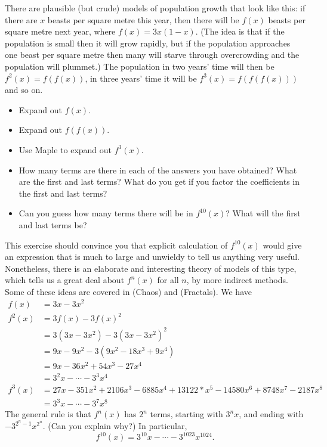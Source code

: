 \documentclass[a4paper]{book}
\theoremstyle{definition}
\newenvironment{starex}{
 \renewcommand{\thetheorem}{\arabic{chapter}.\arabic{section}.\arabic{theorem}${}^*$}
 \exercise
}{\endexercise}
\renewenvironment{solution}{\SolutionInline}{\endSolutionInline}
\begin{document}
\begin{starex}
 There are plausible (but crude) models of population growth
  that look like this: if there are $x$ beasts
 per square metre this year, then there will be $f(x)$ beasts per square
 metre next year, where $f(x)=3x(1-x)$.  (The idea is that if the
 population is small then it will grow rapidly, but if the population
 approaches one beast per square metre then many will starve
 through overcrowding and the population will plummet.)  The population
 in two years' time will then be $f^2(x)=f(f(x))$, in three years' time
 it will be $f^3(x)=f(f(f(x)))$ and so on.
 \begin{itemize}
  \item Expand out $f(x)$.
  \item Expand out $f(f(x))$.
  \item Use Maple to expand out $f^3(x)$.
  \item How many terms are there in each of the answers you have
   obtained?  What are the first and last terms?  What do you get if
   you factor the coefficients in the first and last terms?
  \item Can you guess how many terms there will be in $f^{10}(x)$?
   What will the first and last terms be?
 \end{itemize}
 This exercise should convince you that explicit calculation of
 $f^{10}(x)$ would give an expression that is much to large and
 unwieldy to tell us anything very useful.  Nonetheless, there is an
 elaborate and interesting theory of models of this type, which tells
 us a great deal about $f^n(x)$ for all $n$, by more indirect
 methods.  Some of these ideas are covered in  (Chaos) and
  (Fractals).
\end{starex}
\begin{solution}
 We have
 \begin{align*}
  f(x)   &= 3x - 3x^2 \\
  f^2(x) &= 3f(x) - 3f(x)^2 \\
         &= 3(3x-3x^2) - 3(3x-3x^2)^2 \\
         &= 9x - 9x^2 - 3(9x^2 - 18 x^3 + 9x^4) \\
         &= 9x - 36x^2 + 54 x^3 - 27 x^4 \\
         &= 3^2x - \cdots - 3^3 x^4 \\
  f^3(x) &= 27x-351x^2+2106x^3-6885x^4+
            13122*x^5-14580x^6+8748x^7-2187x^8 \\
         &= 3^3x - \cdots - 3^7 x^8
 \end{align*}
 The general rule is that $f^n(x)$ has $2^n$ terms, starting with
 $3^nx$, and ending with $-3^{2^n-1}x^{2^n}$.  (Can you explain why?)
 In particular,
 \[ f^{10}(x) = 3^{10}x - \cdots - 3^{1023}x^{1024}. \]
\end{solution}
\end{document}
